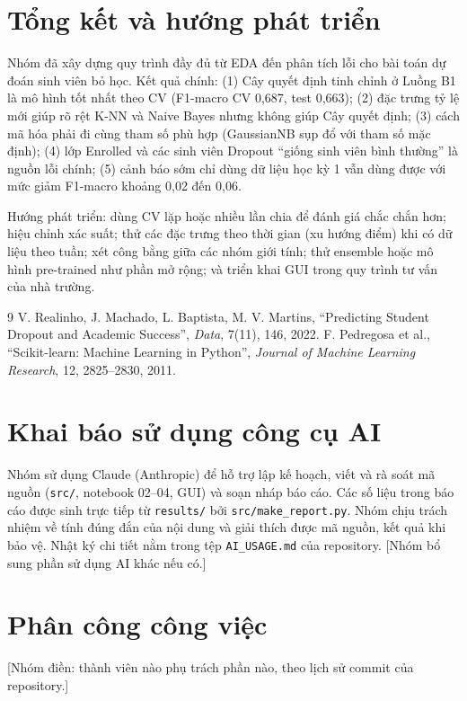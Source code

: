 \documentclass[12pt,a4paper]{article}
\begin{document}
\section{Tổng kết và hướng phát triển}
Nhóm đã xây dựng quy trình đầy đủ từ EDA đến phân tích lỗi cho bài toán dự đoán sinh viên bỏ học. Kết quả chính: (1) Cây quyết định tinh chỉnh ở
Luồng B1 là mô hình tốt nhất theo CV (F1-macro CV 0,687, test 0,663); (2) đặc trưng tỷ lệ mới giúp rõ rệt K-NN và Naive Bayes nhưng không giúp
Cây quyết định; (3) cách mã hóa phải đi cùng tham số phù hợp (GaussianNB sụp đổ với tham số mặc định); (4) lớp Enrolled và các sinh viên Dropout ``giống sinh viên bình thường'' là
nguồn lỗi chính; (5) cảnh báo sớm chỉ dùng dữ liệu học kỳ 1 vẫn dùng được với mức giảm F1-macro khoảng 0,02 đến 0,06.

Hướng phát triển: dùng CV lặp hoặc nhiều lần chia để đánh giá chắc chắn hơn; hiệu chỉnh xác suất; thử các đặc trưng theo thời gian (xu hướng điểm) khi có dữ liệu theo tuần;
xét công bằng giữa các nhóm giới tính; thử ensemble hoặc mô hình pre-trained như phần mở rộng; và triển khai GUI trong quy trình tư vấn của nhà trường.

\begin{thebibliography}{9}
 V. Realinho, J. Machado, L. Baptista, M. V. Martins, ``Predicting Student Dropout and Academic Success'', \textit{Data}, 7(11), 146, 2022.
 F. Pedregosa et al., ``Scikit-learn: Machine Learning in Python'', \textit{Journal of Machine Learning Research}, 12, 2825--2830, 2011.
\end{thebibliography}

\appendix
\section{Khai báo sử dụng công cụ AI}
Nhóm sử dụng Claude (Anthropic) để hỗ trợ lập kế hoạch, viết và rà soát mã nguồn (\texttt{src/}, notebook 02--04, GUI) và soạn nháp báo cáo. Các số liệu trong báo cáo được
sinh trực tiếp từ \texttt{results/} bởi \texttt{src/make\_report.py}. Nhóm chịu trách nhiệm về tính đúng đắn của nội dung và giải thích được mã nguồn, kết quả khi bảo vệ.
Nhật ký chi tiết nằm trong tệp \texttt{AI\_USAGE.md} của repository. [Nhóm bổ sung phần sử dụng AI khác nếu có.]

\section{Phân công công việc}
[Nhóm điền: thành viên nào phụ trách phần nào, theo lịch sử commit của repository.]
\end{document}
